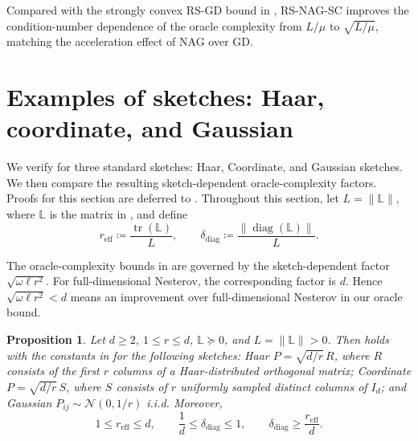 \documentclass[10pt]{article}
\newtheorem{proposition}[proposition]{Proposition}
\newcommand{\tr}{\operatorname{tr}}
\newcommand{\diag}{\operatorname{diag}}
\newcommand{\Lmat}{\mathbb{L}}
\begin{document}
Compared with the strongly convex RS-GD bound in
, RS-NAG-SC improves the condition-number
dependence of the oracle complexity from \(L/\mu\) to \(\sqrt{L/\mu}\),
matching the acceleration effect of NAG over GD.



\section{Examples of sketches: Haar, coordinate, and Gaussian}
\label{sec:sketch-examples}
We verify  for three standard sketches: Haar,
Coordinate, and Gaussian sketches. We then compare the resulting
sketch-dependent oracle-complexity factors. Proofs for this section are
deferred to .
Throughout this section, let \(L=\|\Lmat\|\), where \(\Lmat\) is the matrix in
, and define
\[
r_{\mathrm{eff}}\coloneqq\frac{\tr(\Lmat)}{L},
\qquad
\delta_{\mathrm{diag}}\coloneqq\frac{\|\diag(\Lmat)\|}{L}.
\]

The oracle-complexity bounds in
 are governed by the
sketch-dependent factor
\(\sqrt{\omega\ell r^2}.
\)
For full-dimensional Nesterov, the corresponding factor is \(d\). Hence
\(\sqrt{\omega\ell r^2}<d\) means an improvement over full-dimensional Nesterov in our oracle bound.



\begin{proposition}
\label{prop:verify-sketch-common}
Let \(d\ge2\), \(1\le r\le d\), \(\Lmat\succeq0\), and
\(L=\|\Lmat\|>0\). 
Then  holds with the constants in
 for the following sketches:
Haar \(P=\sqrt{d/r}\,R\), where \(R\) consists of the first \(r\) columns of a
Haar-distributed orthogonal matrix; Coordinate
\(P=\sqrt{d/r}\,S\), where \(S\) consists of \(r\) uniformly sampled distinct
columns of \(I_d\); and Gaussian \(P_{ij}\sim\mathcal N(0,1/r)\) i.i.d.
Moreover,
\[
1\le r_{\mathrm{eff}}\le d,
\qquad
\frac1d\le \delta_{\mathrm{diag}}\le 1,
\qquad
\delta_{\mathrm{diag}}\ge \frac{r_{\mathrm{eff}}}{d}.
\]
\end{proposition}
\end{document}
